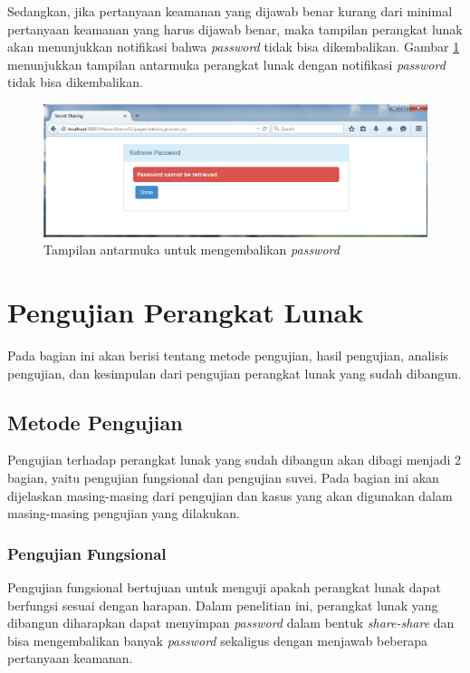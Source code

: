 Sedangkan, jika pertanyaan keamanan yang dijawab benar kurang dari minimal pertanyaan keamanan yang harus dijawab benar, maka tampilan perangkat lunak akan menunjukkan notifikasi bahwa \textit{password} tidak bisa dikembalikan. Gambar \ref{fig:tampilan4_1} menunjukkan tampilan antarmuka perangkat lunak dengan notifikasi \textit{password} tidak bisa dikembalikan.

\begin{figure}[H]
	\includegraphics[scale=0.5]{Gambar/tampilan4_1}
	\centering
	\caption{Tampilan antarmuka untuk mengembalikan \textit{password}}\label{fig:tampilan4_1}
\end{figure}

\section{Pengujian Perangkat Lunak}

Pada bagian ini akan berisi tentang metode pengujian, hasil pengujian, analisis pengujian, dan kesimpulan dari pengujian perangkat lunak yang sudah dibangun.

\subsection{Metode Pengujian}

Pengujian terhadap perangkat lunak yang sudah dibangun akan dibagi menjadi 2 bagian, yaitu pengujian fungsional dan pengujian suvei. Pada bagian ini akan dijelaskan masing-masing dari pengujian dan kasus yang akan digunakan dalam masing-masing pengujian yang dilakukan.

\subsubsection{Pengujian Fungsional}
	
Pengujian fungsional bertujuan untuk menguji apakah perangkat lunak dapat berfungsi sesuai dengan harapan. Dalam penelitian ini, perangkat lunak yang dibangun diharapkan dapat menyimpan \textit{password} dalam bentuk \textit{share-share} dan bisa mengembalikan banyak \textit{password} sekaligus dengan menjawab beberapa pertanyaan keamanan.

